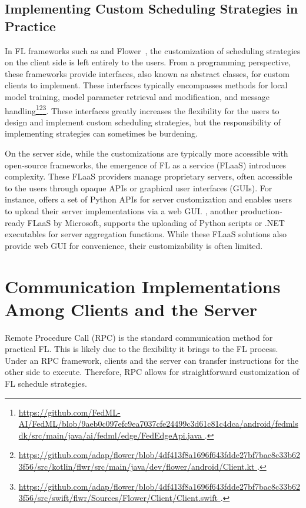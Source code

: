\documentclass[conference]{IEEEtran}
\begin{document}
\subsection{Implementing Custom Scheduling Strategies in Practice}

\newcommand{\Flower}{Flower~\cite{beutel2020flower}}

In FL frameworks such as \FedML{} and \Flower{},
the customization of scheduling strategies on the client side is
left entirely to the users.
From a programming perspective,
these frameworks provide interfaces,
also known as abstract classes,
for custom clients to implement.
These interfaces typically encompasses methods for
local model training,
model parameter retrieval and modification,
and message handling\footnote{\url{
    https://github.com/FedML-AI/FedML/blob/9aeb0c097efc9ea7037cfe24499c3d61c81c4dca/android/fedmlsdk/src/main/java/ai/fedml/edge/FedEdgeApi.java
}.}\footnote{\url{
    https://github.com/adap/flower/blob/4df413f8a1696f643fdde27bf7bac8c33b623f56/src/kotlin/flwr/src/main/java/dev/flower/android/Client.kt
}.}\footnote{\url{
    https://github.com/adap/flower/blob/4df413f8a1696f643fdde27bf7bac8c33b623f56/src/swift/flwr/Sources/Flower/Client/Client.swift
}.}.
These interfaces greatly increases the flexibility for the users to
design and implement custom scheduling strategies,
but the responsibility of implementing strategies can sometimes be burdening.

On the server side,
while the customizations are typically more accessible with
open-source frameworks,
the emergence of FL as a service (FLaaS)
introduces complexity.
These FLaaS providers manage proprietary servers,
often accessible to the users through opaque APIs or
graphical user interfaces (GUIs).
For instance, \FedML{}
offers a set of Python APIs for server customization
and enables users to upload their server implementations via a web GUI.
\Florida{}, another production-ready FLaaS by Microsoft,
supports the uploading of Python scripts or .NET executables for
server aggregation functions.
While these FLaaS solutions also provide web GUI for convenience,
their customizability is often limited.

\section{Communication Implementations Among Clients and the Server}

\label{sec:communication}

Remote Procedure Call (RPC) is the standard communication method for
practical FL.
This is likely due to the flexibility it brings to the FL process.
Under an RPC framework,
clients and the server can transfer instructions for the other side to execute.
Therefore, RPC allows for straightforward customization of
FL schedule strategies.
\end{document}
